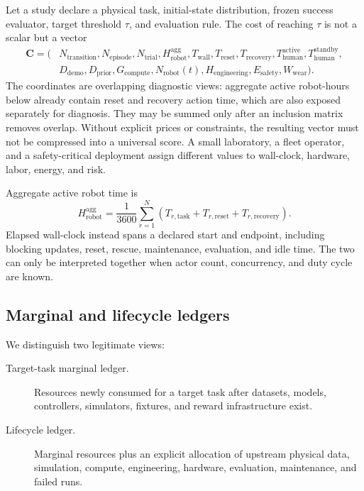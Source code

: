 \documentclass[11pt]{article}
\begin{document}
Let a study declare a physical task, initial-state distribution, frozen success evaluator, target threshold $\tau$, and evaluation rule. The cost of reaching $\tau$ is not a scalar but a vector
\begin{align}
\mathbf{C} = (&N_{\mathrm{transition}},N_{\mathrm{episode}},N_{\mathrm{trial}},
H_{\mathrm{robot}}^{\mathrm{agg}},T_{\mathrm{wall}},T_{\mathrm{reset}},
T_{\mathrm{recovery}},T_{\mathrm{human}}^{\mathrm{active}},
T_{\mathrm{human}}^{\mathrm{standby}}, \nonumber\\
&D_{\mathrm{demo}},D_{\mathrm{prior}},G_{\mathrm{compute}},
N_{\mathrm{robot}}(t),H_{\mathrm{engineering}},
E_{\mathrm{safety}},W_{\mathrm{wear}}).
\end{align}
The coordinates are overlapping diagnostic views: aggregate active robot-hours below already contain reset and recovery action time, which are also exposed separately for diagnosis. They may be summed only after an inclusion matrix removes overlap. Without explicit prices or constraints, the resulting vector must not be compressed into a universal score. A small laboratory, a fleet operator, and a safety-critical deployment assign different values to wall-clock, hardware, labor, energy, and risk.

Aggregate active robot time is
\begin{equation}
H_{\mathrm{robot}}^{\mathrm{agg}}=
\frac{1}{3600}\sum_{r=1}^{N}\left(
T_{r,\mathrm{task}}+T_{r,\mathrm{reset}}+T_{r,\mathrm{recovery}}
\right).
\end{equation}
Elapsed wall-clock instead spans a declared start and endpoint, including blocking updates, reset, rescue, maintenance, evaluation, and idle time. The two can only be interpreted together when actor count, concurrency, and duty cycle are known.

\subsection{Marginal and lifecycle ledgers}

We distinguish two legitimate views:
\begin{description}
    \item[Target-task marginal ledger.] Resources newly consumed for a target task after datasets, models, controllers, simulators, fixtures, and reward infrastructure exist.
    \item[Lifecycle ledger.] Marginal resources plus an explicit allocation of upstream physical data, simulation, compute, engineering, hardware, evaluation, maintenance, and failed runs.
\end{description}
\end{document}
